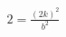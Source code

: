 \documentclass[preview]{standalone}
\begin{document}
\begin{align*}
2 = \frac{(2k)^2}{b^2}
\end{align*}
\end{document}
